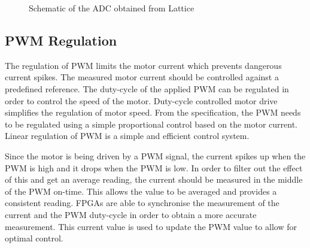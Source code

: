 \begin{figure}[h]
\centering

\caption{Schematic of the ADC obtained from Lattice\cite{LatticeADC}}
\label{adc_schematic}
\end{figure}



\subsection{PWM Regulation}

The regulation of PWM limits the motor current which prevents dangerous current spikes. The measured motor current should be controlled against a predefined reference\cite{Aime}. The duty-cycle of the applied PWM can be regulated in order to control the speed of the motor\cite{Sathyan}. Duty-cycle controlled motor drive simplifies the regulation of motor speed\cite{Sathyan}.
From the specification, the PWM needs to be regulated using a simple proportional control based on the motor current. Linear regulation of PWM is a simple and efficient control system\cite{Sathyan}. 

Since the motor is being driven by a PWM signal, the current spikes up when the PWM is high and it drops when the PWM is low. In order to filter out the effect of this and get an average reading, the current should be measured in the middle of the PWM on-time. This allows the value to be averaged and provides a consistent reading.
FPGAs are able to synchronise the measurement of the current and the PWM duty-cycle in order to obtain a more accurate measurement\cite{MonmassonDesign, Gomes}. This current value is used to update the PWM value to allow for optimal control.


